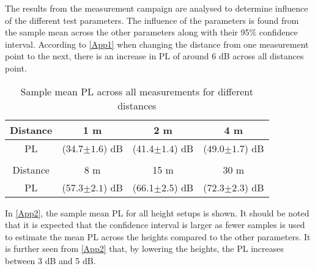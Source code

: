 
The results from the measurement campaign are analysed to determine influence of the different test parameters. The influence of the parameters is found from the sample mean across the other parameters along with their 95\% confidence interval. According to \autoref{App1} when changing the distance from one measurement point to the next, there is an increase in PL of around 6 dB across all distances point.
\vspace{2em}
\begin{table}[!htbp]
\centering
\caption{Sample mean PL across all measurements for different distances}
\label{App1}
\begin{tabular}{|c|c|c|c|}
\hline
Distance    & 1 m & 2 m& 4 m\\\hline
PL & (34.7$\pm 1.6$) dB & (41.4$\pm 1.4$) dB & (49.0$\pm 1.7$) dB  \\\hline
\multicolumn{4}{c}{}\\\hline
Distance	&8 m& 15 m& 30 m\\\hline
PL &	(57.3$\pm 2.1$) dB & (66.1$\pm 2.5$) dB & (72.3$\pm 2.3$) dB \\\hline
\end{tabular}
\end{table}
\newpage


In \autoref{App2}, the sample mean PL for all height setups is shown. It should be noted that it is expected that the confidence interval is larger as fewer samples is used to estimate the mean PL across the heights compared to the other parameters. It is further seen from \autoref{App2} that, by lowering the heights, the PL increases between 3 dB and 5 dB.

\begin{table}[H]
\centering
\caption{Sample mean PL across all measurements for different height combinations}
\label{App2}
\end{table}



